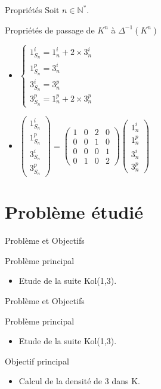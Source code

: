 \documentclass[12pt]{beamer}
\begin{document}
\begin{frame}[t]{Propriétés}
Soit $n \in \mathbb{N}^*$.
 \begin{block}{Propriétés de passage de $K^n$ à $\Delta^{-1}(K^n)$}
\begin{itemize}
\item 
$\left\{ \begin{array}{l}
1_{S_n}^i=1_n^i+2 \times 3_n^i \\ 
1_{S_n}^p=3_n^i \\ 
3_{S_n}^i=3_n^p \\ 
3_{S_n}^p=1_n^p+2 \times 3_n^p
\end{array}$
\item 
$\left( \begin{array}{c}
1_{S_n}^i \\ 
1_{S_n}^p \\ 
3_{S_n}^i \\ 
3_{S_n}^p
\end{array} \right) = 
\left( \begin{array}{cccc}
1 & 0 & 2 & 0 \\ 
0 & 0 & 1 & 0 \\ 
0 & 0 & 0 & 1 \\ 
0 & 1 & 0 & 2
\end{array} \right)
\left( \begin{array}{c}
1_n^i \\ 
1_n^p \\ 
3_n^i \\ 
3_n^p
\end{array} \right)$
    \end{itemize}
  \end{block}
\end{frame}
\section{Problème étudié}
\begin{frame}[t]{Problème et Objectifs}
 \begin{block}{Problème principal}
    \begin{itemize}
     \item  Etude de la suite Kol(1,3).
    \end{itemize}
  \end{block}
\end{frame}
\begin{frame}[t]{Problème et Objectifs}
\begin{block}{Problème principal}
    \begin{itemize}
     \item  Etude de la suite Kol(1,3).
    \end{itemize}
  \end{block}
 \begin{block}{Objectif principal}
    \begin{itemize} 
  \item Calcul de la densité de 3 dans K.
    \end{itemize}
  \end{block}
\end{frame}
\end{document}
